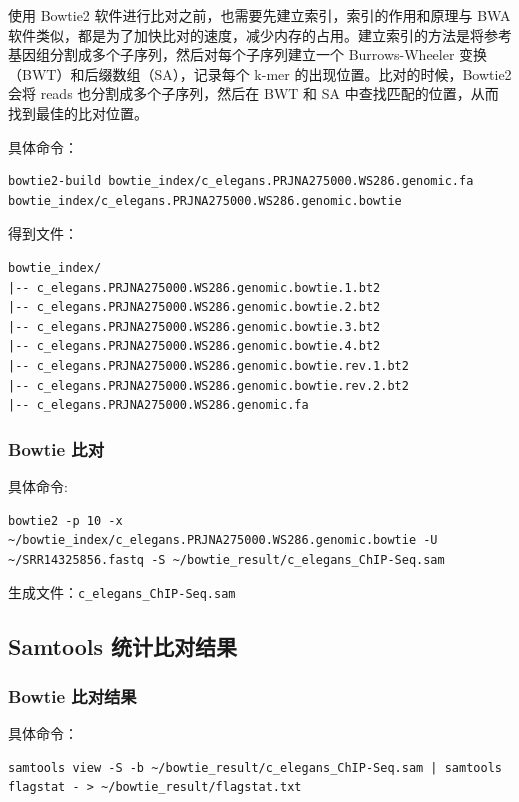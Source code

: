 \documentclass[UTF8]{ctexart}
\begin{document}
使用 Bowtie2 软件进行比对之前，也需要先建立索引，索引的作用和原理与 BWA 软件类似，都是为了加快比对的速度，减少内存的占用。建立索引的方法是将参考基因组分割成多个子序列，然后对每个子序列建立一个 Burrows-Wheeler 变换（BWT）和后缀数组（SA），记录每个 k-mer 的出现位置。比对的时候，Bowtie2 会将 reads 也分割成多个子序列，然后在 BWT 和 SA 中查找匹配的位置，从而找到最佳的比对位置。

具体命令：

\begin{lstlisting}
bowtie2-build bowtie_index/c_elegans.PRJNA275000.WS286.genomic.fa bowtie_index/c_elegans.PRJNA275000.WS286.genomic.bowtie
\end{lstlisting}

得到文件：

\begin{lstlisting}
bowtie_index/
|-- c_elegans.PRJNA275000.WS286.genomic.bowtie.1.bt2
|-- c_elegans.PRJNA275000.WS286.genomic.bowtie.2.bt2
|-- c_elegans.PRJNA275000.WS286.genomic.bowtie.3.bt2
|-- c_elegans.PRJNA275000.WS286.genomic.bowtie.4.bt2
|-- c_elegans.PRJNA275000.WS286.genomic.bowtie.rev.1.bt2
|-- c_elegans.PRJNA275000.WS286.genomic.bowtie.rev.2.bt2
|-- c_elegans.PRJNA275000.WS286.genomic.fa
\end{lstlisting}

\subsubsection{Bowtie 比对}

具体命令:

\begin{lstlisting}
bowtie2 -p 10 -x ~/bowtie_index/c_elegans.PRJNA275000.WS286.genomic.bowtie -U ~/SRR14325856.fastq -S ~/bowtie_result/c_elegans_ChIP-Seq.sam
\end{lstlisting}

生成文件：\verb|c_elegans_ChIP-Seq.sam|

\subsection{Samtools 统计比对结果}

\subsubsection{Bowtie 比对结果}

具体命令：

\begin{lstlisting}
samtools view -S -b ~/bowtie_result/c_elegans_ChIP-Seq.sam | samtools flagstat - > ~/bowtie_result/flagstat.txt
\end{lstlisting}
\end{document}
